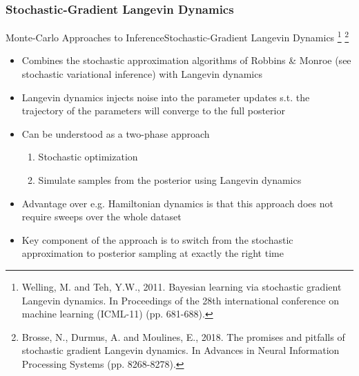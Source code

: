 \documentclass[AERbeamer%
              ,optEnglish%
              ,optBiber%
              ,optBibstyleAlphabetic%
              ,optBeamerClassicFormat%
              ]{AERlatex}%
\begin{document}
\subsubsection*{Stochastic-Gradient Langevin Dynamics}
\begin{frame}[c]{Monte-Carlo Approaches to Inference}{Stochastic-Gradient Langevin Dynamics \footnote{Welling, M. and Teh, Y.W., 2011. Bayesian learning via stochastic gradient Langevin
                                                                                                      dynamics. In Proceedings of the 28th international conference on machine learning
                                                                                                      (ICML-11) (pp. 681-688).}
                                                                                            \footnote{Brosse, N., Durmus, A. and Moulines, E., 2018. The promises and pitfalls of stochastic
                                                                                                      gradient Langevin dynamics. In Advances in Neural Information Processing Systems (pp. 8268-8278).}}
    \centering
    \begin{itemize}
        \item Combines the stochastic approximation algorithms of Robbins \& Monroe (see stochastic variational inference) with Langevin dynamics
        \item Langevin dynamics injects noise into the parameter updates s.t. the trajectory of the parameters will converge to the full posterior
        \item Can be understood as a two-phase approach
        \begin{enumerate}
            \item Stochastic optimization
            \item Simulate samples from the posterior using Langevin dynamics
        \end{enumerate}
        \item Advantage over e.g. Hamiltonian dynamics is that this approach does not require sweeps over the whole dataset
        \item Key component of the approach is to switch from the stochastic approximation to posterior sampling at exactly the right time
    \end{itemize}
\end{frame}
\end{document}
